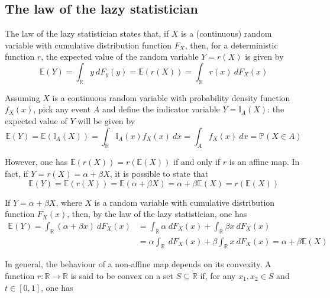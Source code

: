 \documentclass{report}
\begin{document}
\subsection{The law of the lazy statistician}
The law of the lazy statistician states that, if $\displaystyle X$ is a (continuous) random variable with cumulative distribution function $\displaystyle F_X$, then, for a deterministic function $\displaystyle r$, the expected value of the random variable $\displaystyle Y = r(X)$ is given by
\[\mathbb{E}(Y) = \int_{\mathbb{R}} y \ dF_y(y) = \mathbb{E}(r(X)) = \int_{\mathbb{R}} r(x) \ dF_X(x)\]
\begin{examplebox}
    Assuming $\displaystyle X$ is a continuous random variable with probability density function $\displaystyle f_X(x)$, pick any event $\displaystyle A$ and define the indicator variable $\displaystyle Y = \mathbb{I}_A(X)$: the expected value of $\displaystyle Y$ will be given by
    \[\mathbb{E}(Y) = \mathbb{E}(\mathbb{I}_A(X)) = \int_{\mathbb{R}} \mathbb{I}_A(x)f_X(x) \ dx = \int_A f_X(x) \ dx = \mathbb{P}(X \in A)\]
\end{examplebox}
\noindent However, one has $\displaystyle \mathbb{E}(r(X)) = r(\mathbb{E}(X))$ if and only if $\displaystyle r$ is an affine map. \newline
In fact, if $\displaystyle Y = r(X) = \alpha + \beta X$, it is possible to state that
\[\mathbb{E}(Y) = \mathbb{E}(r(X)) = \mathbb{E}(\alpha + \beta X) = \alpha + \beta\mathbb{E}(X) = r(\mathbb{E}(X))\]
\begin{proofbox}
    If $\displaystyle Y = \alpha + \beta X$, where $\displaystyle X$ is a random variable with cumulative distribution function $\displaystyle F_X(x)$, then, by the law of the lazy statistician, one has
    \begin{align*}
        \mathbb{E}(Y) = \int_{\mathbb{R}} (\alpha + \beta x) \ dF_X(x)
            &= \int_{\mathbb{R}} \alpha \ dF_X(x) + \int_{\mathbb{R}} \beta x \ dF_X(x) \\
            &= \alpha\int_{\mathbb{R}} \ dF_X(x) + \beta\int_{\mathbb{R}} x \ dF_X(x) = \alpha + \beta\mathbb{E}(X)
    \end{align*}
\end{proofbox}
\noindent In general, the behaviour of a non-affine map depends on its convexity. \newline
A function $\displaystyle r: \mathbb{R} \to \mathbb{R}$ is said to be convex on a set $\displaystyle S \subseteq \mathbb{R}$ if, for any $\displaystyle x_1, x_2 \in S$ and $\displaystyle t \in [0, 1]$, one has
\end{document}
